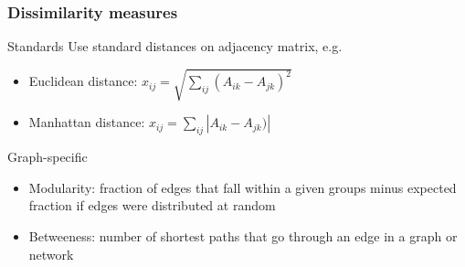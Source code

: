 \documentclass{beamer}\usepackage[]{graphicx}\usepackage[]{color}
\begin{document}
\begin{frame}
  \frametitle{Dissimilarity measures}

  \begin{block}{Standards}
    Use standard distances on adjacency matrix, e.g.
    \begin{itemize}
      \item Euclidean distance: $\displaystyle x_{ij} = \sqrt{\sum_{ij} (A_{ik} - A_{jk})^2} $
      \item Manhattan distance: $\displaystyle x_{ij} = \sum_{ij} |A_{ik} - A_{jk})| $
    \end{itemize}  
  \end{block}

  \vfill

  \begin{block}{Graph-specific}
    \begin{itemize}
      \item \alert{Modularity}:  fraction of edges that fall within a given groups minus expected fraction if edges were distributed at random
      \item \alert{Betweeness}: number of shortest paths that go through an edge in a graph or network
      \end{itemize}
  \end{block}
  
\end{frame}
\end{document}
